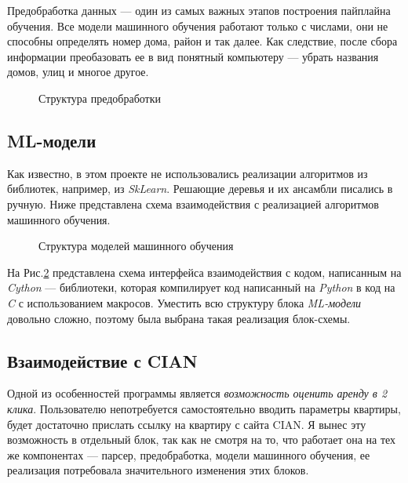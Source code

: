 \documentclass{article}
\begin{document}
			Предобработка данных --- один из самых важных этапов построения пайплайна обучения. Все модели машинного обучения работают только с числами, они не способны определять номер дома, район и так далее. Как следствие, после сбора информации преобазовать ее в вид понятный компьютеру --- убрать названия домов, улиц и многое другое.	
			
			\begin{figure}[H]
				\centering
				\caption{Структура предобработки}
				\label{fig:preprocessing}
			\end{figure}
			
	
	
		\newpage
		\subsection{ML-модели}
			
			Как известно, в этом проекте не использовались реализации алгоритмов из библиотек, например, из \textit{SkLearn}. Решающие деревья и их ансамбли писались в ручную. Ниже представлена схема взаимодействия с реализацией алгоритмов машинного обучения.
			
			\begin{figure}[H]
				\centering
				\caption{Структура моделей машинного обучения}
				\label{fig:ml_model}
			\end{figure}
		
			На Рис.\ref{fig:ml_model} представлена схема интерфейса взаимодействия с кодом, написанным на \textit{Cython} \cite{litlink10} --- библиотеки, которая компилирует код написанный на \textit{Python} в код на \textit{C} с использованием макросов. Уместить всю структуру блока \textit{ML-модели} довольно сложно, поэтому была выбрана такая реализация блок-схемы.
			
		\newpage
		\subsection{Взаимодействие с CIAN}
		
			Одной из особенностей программы является \textit{возможность оценить аренду в 2 клика}. Пользователю непотребуется самостоятельно вводить параметры квартиры, будет достаточно прислать ссылку на квартиру с сайта CIAN. Я вынес эту возможность в отдельный блок, так как не смотря на то, что работает она на тех же компонентах --- парсер, предобработка, модели машинного обучения, ее реализация потребовала значительного изменения этих блоков.
			
\end{document}
